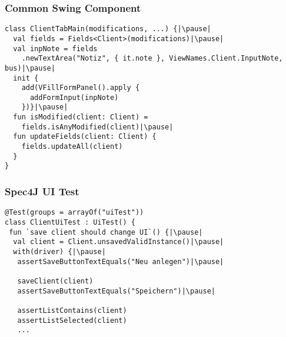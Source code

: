 
\begin{frame}[fragile] \frametitle{Common Swing Component}
\begin{lstlisting}
class ClientTabMain(modifications, ...) {|\pause|
  val fields = Fields<Client>(modifications)|\pause|
  val inpNote = fields
    .newTextArea("Notiz", { it.note }, ViewNames.Client.InputNote, bus)|\pause|
  init {
    add(VFillFormPanel().apply {
      addFormInput(inpNote)
    })}|\pause|
  fun isModified(client: Client) = 
    fields.isAnyModified(client)|\pause|
  fun updateFields(client: Client) {
    fields.updateAll(client)
  }
}
\end{lstlisting}
\end{frame}

\begin{frame}[fragile] \frametitle{Spec4J UI Test}
\begin{lstlisting}
@Test(groups = arrayOf("uiTest"))
class ClientUiTest : UiTest() {
 fun `save client should change UI`() {|\pause|
  val client = Client.unsavedValidInstance()|\pause|
  with(driver) {|\pause|
   assertSaveButtonTextEquals("Neu anlegen")|\pause|

   saveClient(client)
   assertSaveButtonTextEquals("Speichern")|\pause|

   assertListContains(client)
   assertListSelected(client)
   ...
\end{lstlisting}
\end{frame}



